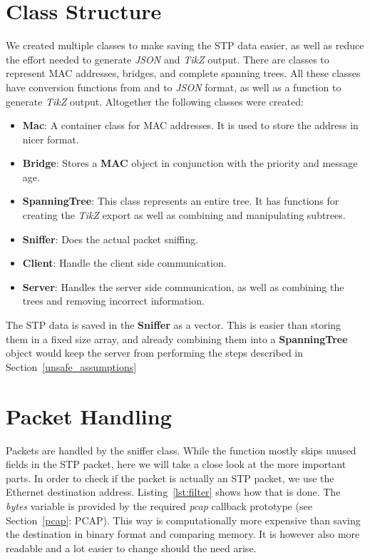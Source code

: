 \section{Class Structure}
\label{data}
We created multiple classes to make saving the STP data easier, as well as reduce the effort needed to generate \textit{JSON} and \textit{TikZ} output.
There are classes to represent MAC addresses, bridges, and complete spanning trees.
All these classes have conversion functions from and to \textit{JSON} format, as well as a function to generate \textit{TikZ} output.
Altogether the following classes were created:
\begin{itemize}
    \item \textbf{Mac}: A container class for MAC addresses.
        It is used to store the address in nicer format.
    \item \textbf{Bridge}: Stores a \textbf{MAC} object in conjunction with the priority and message age.
    \item \textbf{SpanningTree}: This class represents an entire tree.
        It has functions for creating the \textit{TikZ} export as well as combining and manipulating subtrees.
    \item \textbf{Sniffer}: Does the actual packet sniffing.
    \item \textbf{Client}: Handle the client side communication.
    \item \textbf{Server}: Handles the server side communication, as well as combining the trees and removing incorrect information.
\end{itemize}
The STP data is saved in the \textbf{Sniffer} as a vector.
This is easier than storing them in a fixed size array, and already combining them into a \textbf{SpanningTree} object would keep the server from performing the steps described in Section~\ref{unsafe_assumptions}

\section{Packet Handling}
\label{packet_handling}
Packets are handled by the sniffer class.
While the function mostly skips unused fields in the STP packet, here we will take a close look at the more important parts.
In order to check if the packet is actually an STP packet, we use the Ethernet destination address.
Listing~\ref{lst:filter} shows how that is done.
The \textit{bytes} variable is provided by the required \textit{pcap} callback prototype (see Section~\ref{pcap}: PCAP).
This way is computationally more expensive than saving the destination in binary format and comparing memory.
It is however also more readable and a lot easier to change should the need arise.


